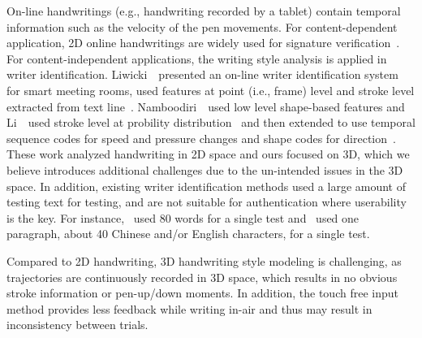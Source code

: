 On-line handwritings (e.g., handwriting recorded by a tablet) contain temporal information such as the velocity of the pen movements. For content-dependent application, 2D online handwritings are widely used for signature verification~\cite{Guru:PAM09}. For content-independent applications, the writing style analysis is applied in writer identification. Liwicki~\etal ~presented an on-line writer identification system for smart meeting rooms, used features at point (i.e., frame) level and stroke level extracted from text line~\cite{Liwicki2006:onlineSmartMeeting}.
Namboodiri~\etal ~used low level shape-based features and Li~\etal ~used stroke level at probility distribution~\cite{Li2007:StrokeProbabilityDistribution} and then extended to use temporal sequence codes for speed and pressure changes and shape codes for direction~\cite{conf/icdar/LiT09}. These work analyzed handwriting in 2D space and ours focused on 3D, which we believe introduces additional challenges due to the un-intended issues in the 3D space. In addition, existing writer identification methods used a large amount of testing text for testing, and are not suitable for authentication where userability is the key. For instance,~\cite{Liwicki2006:onlineSmartMeeting} used 80 words for a single test and~\cite{conf/icdar/LiT09} used one paragraph, about 40 Chinese and/or English characters, for a single test.
  
Compared to 2D handwriting, 3D handwriting style modeling is challenging, as trajectories are continuously recorded in 3D space, which results in no obvious stroke information or pen-up/down moments. In addition, the touch free input method provides less feedback while writing in-air and thus may result in inconsistency between trials. 



